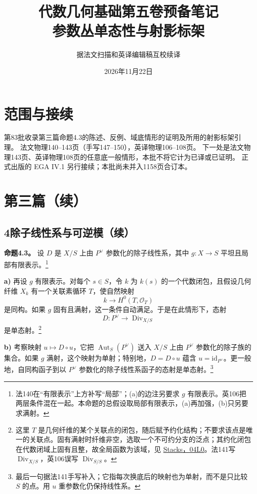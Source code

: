 \documentclass[openany,fontset=fandol]{ctexbook}
\DeclareMathOperator{\Aut}{Aut}
\DeclareMathOperator{\Div}{Div}
\newcommand{\OO}{\mathcal O}
\begin{document}
\title{代数几何基础第五卷预备笔记\\参数丛单态性与射影标架}
\author{据法文扫描和英译编辑稿互校续译}
\date{2026年11月22日}
\maketitle
\chapter*{范围与接续}
第83批收录第三篇命题4.3的陈述、反例、域底情形的证明及所用的射影标架引理。
法文物理140--143页（手写147--150），英译物理106--108页。
下一处是法文物理143页、英译物理108页的任意底一般情形，本批不将它计为已译或已证明。
正式出版的 EGA IV.1 另行接续；本批尚未并入1158页合订本。

\chapter*{第三篇（续）}
\section*{4\quad 除子线性系与可逆模（续）}

\noindent\textbf{命题4.3。}
设 \(D\) 是 \(X/S\) 上由 \(P^\vee\) 参数化的除子线性系，其中 \(g:X\to S\) 平坦且局部有限表示。\footnote{法140在“有限表示”上方补写“局部”；(a)的边注另要求 \(g\) 有限表示。英106把两层条件混在一起。本命题的总假设取局部有限表示，(a)再加强，(b)只另要求满射。}

\noindent\textbf{a)}
再设 \(g\) 有限表示。对每个 \(s\in S\)，令 \(k\) 为 \(k(s)\) 的一个代数闭包，且假设几何纤维 \(X_k\) 有一个关联素循环 \(T\)，使自然映射
\[
 k\longrightarrow H^0(T,\OO_T)
\]
是同构。如果 \(g\) 固有且满射，这一条件自动满足。于是在此情形下，态射
\[
 D:P^\vee\longrightarrow\Div_{X/S}
\]
是单态射。\footnote{这里 \(T\) 是几何纤维的某个关联点的闭包，随后赋予约化结构；不要求该点是唯一的关联点。固有满射时纤维非空，选取一个不可约分支的泛点；其约化闭包在代数闭域上固有且整，故全局函数为该域，见 \href{https://stacks.math.columbia.edu/tag/04L0}{Stacks，04L0}。法141写 \(\Div_{X/S}\)，英106误写 \(\Div_{S/S}\)。}

\noindent\textbf{b)}
考察映射 \(u\mapsto D\circ u\)，它把 \(\Aut_S(P^\vee)\) 送入 \(X/S\) 上由 \(P^\vee\) 参数化的除子族的集合。如果 \(g\) 满射，这个映射为单射；特别地，\(D=D\circ u\) 蕴含 \(u=\mathrm{id}_{P^\vee}\)。更一般地，自同构函子到以 \(P^\vee\) 参数化的除子线性系函子的态射是单态射。\footnote{最后一句据法141手写补入；它指每次换底后的映射也为单射，而不是只比较 \(S\) 的点。用 \(u\) 重参数化仍保持线性系。}
\end{document}
